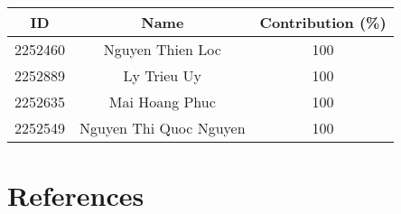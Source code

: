 \documentclass[a4paper]{article}
\begin{document}
\newpage
\tableofcontents
\newpage
\listoffigures
\newpage
\begin{center}
\begin{tabular}{|c|c|c|} 
 \hline
 ID & Name & Contribution (\%) \\ 
 \hline
2252460 & Nguyen Thien Loc & 100 \\ 
 \hline
2252889 & Ly Trieu Uy& 100 \\
 \hline
2252635 & Mai Hoang Phuc& 100 \\
 \hline
2252549 & Nguyen Thi Quoc Nguyen& 100 \\
 \hline
\end{tabular}
\end{center}


\newpage
\section{References}

\end{document}
